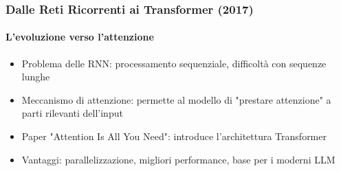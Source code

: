 %
\begin{frame}[t,fragile] \frametitle{Dalle Reti Ricorrenti ai Transformer (2017)}
	{\scriptsize
		\onslide<1->
            \framesubtitle{L'evoluzione verso l'attenzione}
            \vspace*{-15pt}
	    	\begin{minipage}[t]{\textwidth}
				\begin{minipage}[t]{0.6\textwidth}
	    			\begin{itemize}[leftmargin=10pt,align=right]
						\onslide<2->\item[\alert{\faHandORight}] \alert{Problema delle RNN:} processamento sequenziale, difficoltà con sequenze lunghe
						\onslide<3->\item[\alert{\faHandORight}] \alert{Meccanismo di attenzione:} permette al modello di "prestare attenzione" a parti rilevanti dell'input
						\onslide<4->\item[\alert{\faHandORight}] \alert{Paper "Attention Is All You Need":} introduce l'architettura Transformer
						\onslide<5->\item[\alert{\faHandORight}] \alert{Vantaggi:} parallelizzazione, migliori performance, base per i moderni LLM
					\end{itemize}
            	\end{minipage}
	    	\end{minipage}
	}
\end{frame}
%
